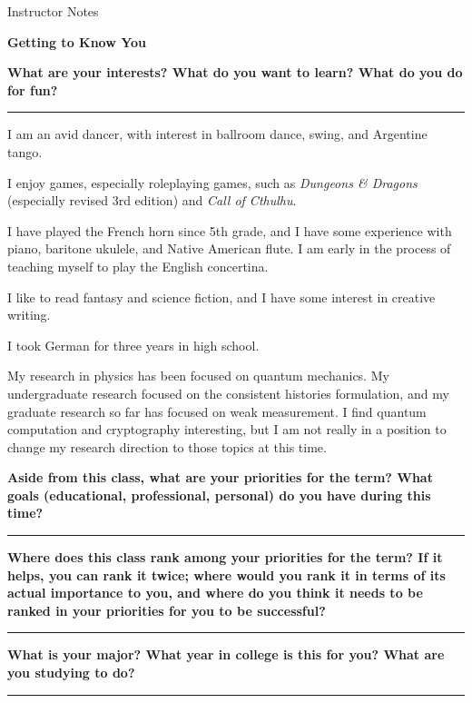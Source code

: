 \documentclass[]{article}
\begin{document}
\newpage
\begin{TeacherMargin}
	Instructor Notes
\end{TeacherMargin}
\begin{PresentSpace}
\begin{center}
	\textbf{Getting to Know You}
\end{center}
\textbf{What are your interests? What do you want to learn? What do you do for fun?}
{\color{blue}\hrule}
\vspace{2pt}
I am an avid dancer, with interest in ballroom dance, swing, and Argentine tango.

I enjoy games, especially roleplaying games, such as \textit{Dungeons \& Dragons} (especially revised 3rd edition) and \textit{Call of Cthulhu}.

I have played the French horn since 5th grade, and I have some experience with piano, baritone ukulele, and Native American flute. I am early in the process of teaching myself to play the English concertina.

I like to read fantasy and science fiction, and I have some interest in creative writing.

I took German for three years in high school.

My research in physics has been focused on quantum mechanics. My undergraduate research focused on the consistent histories formulation, and my graduate research so far has focused on weak measurement. I find quantum computation and cryptography interesting, but I am not really in a position to change my research direction to those topics at this time.

\noindent\textbf{Aside from this class, what are your priorities for the term? What goals (educational, professional, personal) do you have during this time?}
{\color{blue}\hrule}
\vspace{2pt}

\noindent\textbf{Where does this class rank among your priorities for the term? If it helps, you can rank it twice; where would you rank it in terms of its actual importance to you, and where do you think it needs to be ranked in your priorities for you to be successful?}
{\color{blue}\hrule}
\vspace{2pt}

\noindent\textbf{What is your major? What year in college is this for you? What are you studying to do?}
{\color{blue}\hrule}
\vspace{2pt}
\end{PresentSpace}
\end{document}

